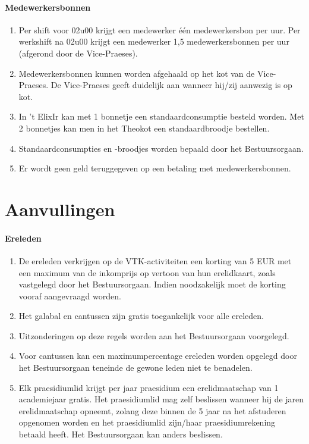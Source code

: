     \subsection{Medewerkersbonnen}
    \begin{enumerate}
    \item Per shift voor 02u00 krijgt een medewerker één medewerkersbon per uur. Per werkshift na 02u00 krijgt een medewerker 1,5 medewerkersbonnen per uur (afgerond door de Vice-Praeses).
    \item Medewerkersbonnen kunnen worden afgehaald op het kot van de Vice-Praeses. De Vice-Praeses geeft duidelijk aan wanneer hij/zij aanwezig is op kot.
    \item In 't ElixIr kan met 1 bonnetje een standaardconsumptie besteld worden. Met 2 bonnetjes kan men in het Theokot een standaardbroodje bestellen.
    \item Standaardconsumpties en -broodjes worden bepaald door het Bestuursorgaan.
    \item Er wordt geen geld teruggegeven op een betaling met medewerkersbonnen.
    \end{enumerate}


\part{Aanvullingen}

    \subsection{Ereleden}
    \begin{enumerate}
    \item De ereleden verkrijgen op de VTK-activiteiten een korting van 5 EUR met een maximum van de inkomprijs op vertoon van hun erelidkaart, zoals vastgelegd door het Bestuursorgaan. Indien noodzakelijk moet de korting vooraf aangevraagd worden.
    \item Het galabal en cantussen zijn gratis toegankelijk voor alle ereleden.
    \item Uitzonderingen op deze regels worden aan het Bestuursorgaan voorgelegd.
    \item Voor cantussen kan een maximumpercentage ereleden worden opgelegd door het Bestuursorgaan teneinde de gewone leden niet te benadelen.
    \item Elk praesidiumlid krijgt per jaar praesidium een erelidmaatschap van 1 academiejaar gratis. Het praesidiumlid mag zelf beslissen wanneer hij de jaren erelidmaatschap opneemt, zolang deze binnen de 5 jaar na het afstuderen opgenomen worden en het praesidiumlid zijn/haar praesidiumrekening betaald heeft. Het Bestuursorgaan kan anders beslissen.
    \end{enumerate}


